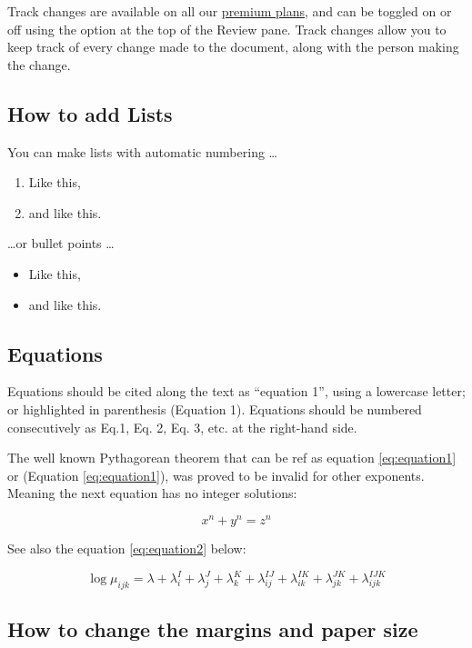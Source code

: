 \documentclass[a4paper,12pt,twoside]{article}
\begin{document}
Track changes are available on all our \href{https://www.overleaf.com/user/subscription/plans}{premium plans}, and can be toggled on or off using the option at the top of the Review pane. Track changes allow you to keep track of every change made to the document, along with the person making the change. 

\subsection{How to add Lists}

You can make lists with automatic numbering \dots

\begin{enumerate}
\item Like this,
\item and like this.
\end{enumerate}
\dots or bullet points \dots
\begin{itemize}
\item Like this,
\item and like this.
\end{itemize}


\subsection{Equations}

Equations should be cited along the text as “equation 1”, using a lowercase letter; or highlighted in parenthesis (Equation 1). Equations should be numbered consecutively as Eq.1, Eq. 2, Eq. 3, etc. at the right-hand side.

The well known Pythagorean theorem that can be ref as equation \ref{eq:equation1} or (Equation \ref{eq:equation1}), was proved to be invalid for other exponents. 
Meaning the next equation has no integer solutions:

\begin{equation}
x^n + y^n = z^n
\label{eq:equation1}
\end{equation}

See also the equation \ref{eq:equation2} below:

\begin{equation}
    \log \mu_{ijk}= \lambda + \lambda_i ^I + \lambda_j ^J+\lambda_k ^K+\lambda_{ij} ^{IJ}+\lambda_{ik} ^{IK}+\lambda_{jk} ^{JK}+\lambda_{ijk} ^{IJK} 
    \label{eq:equation2}
\end{equation}  


\subsection{How to change the margins and paper size}
\end{document}
